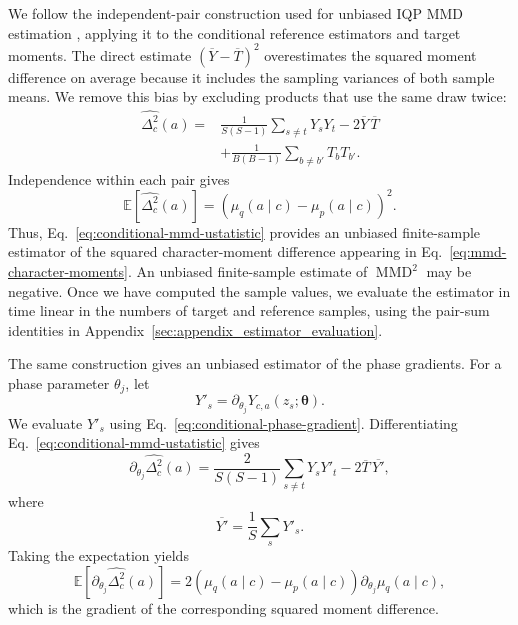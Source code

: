 \documentclass[pra,aps,10pt,twocolumn,floatfix,superscriptaddress, notitlepage,longbibliography]{revtex4-2}
\newcommand{\E}{\mathbb{E}}
\newcommand{\mmd}{\operatorname{MMD}}
\begin{document}
We follow the independent-pair construction used for unbiased IQP MMD estimation \cite[Appendix~A.2.1]{recio-armengolTrainClassicalDeploy2026}, applying it to the conditional reference estimators and target moments. The direct estimate $(\overline Y-\overline T)^2$ overestimates the squared moment difference on average because it includes the sampling variances of both sample means. We remove this bias by excluding products that use the same draw twice:
\begin{equation}
\begin{aligned}
    \widehat{\Delta_c^2}(a)
    ={}&
    \frac{1}{S(S-1)}
    \sum_{s\neq t}Y_sY_t
    -2\overline Y\,\overline T \\
    &+
    \frac{1}{B(B-1)}
    \sum_{b\neq b'}T_bT_{b'} .
\end{aligned}
\label{eq:conditional-mmd-ustatistic}
\end{equation}
Independence within each pair gives
\begin{equation}
    \E\!\left[\widehat{\Delta_c^2}(a)\right]
    =
    \left(
        \mu_q(a\mid c)-\mu_p(a\mid c)
    \right)^2.
\end{equation}
Thus, Eq.~\eqref{eq:conditional-mmd-ustatistic} provides an unbiased finite-sample estimator of the squared character-moment difference appearing in Eq.~\eqref{eq:mmd-character-moments}. An unbiased finite-sample estimate of $\mmd^2$ may be negative. Once we have computed the sample values, we evaluate the estimator in time linear in the numbers of target and reference samples, using the pair-sum identities in Appendix~\ref{sec:appendix_estimator_evaluation}.

The same construction gives an unbiased estimator of the phase gradients. For a phase parameter $\theta_j$, let
\begin{equation}
    Y'_s=
    \partial_{\theta_j}
    Y_{c,a}(z_s;\boldsymbol{\theta}).
\end{equation}
We evaluate $Y'_s$ using Eq.~\eqref{eq:conditional-phase-gradient}. Differentiating Eq.~\eqref{eq:conditional-mmd-ustatistic} gives
\begin{equation}
    \partial_{\theta_j}
    \widehat{\Delta_c^2}(a)
    =
    \frac{2}{S(S-1)}
    \sum_{s\neq t}Y_sY'_t
    -
    2\overline T\,\overline{Y'},
    \label{eq:conditional-mmd-gradient}
\end{equation}
where
\begin{equation}
    \overline{Y'}
    =
    \frac{1}{S}\sum_sY'_s.
\end{equation}
Taking the expectation yields
\begin{equation}
    \E\!\left[
        \partial_{\theta_j}\widehat{\Delta_c^2}(a)
    \right]
    =
    2
    \left(
        \mu_q(a\mid c)-\mu_p(a\mid c)
    \right)
    \partial_{\theta_j}\mu_q(a\mid c),
\end{equation}
which is the gradient of the corresponding squared moment difference.
\end{document}
